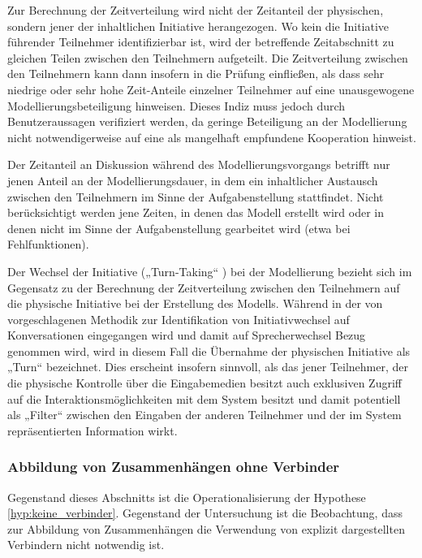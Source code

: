 Zur Berechnung der Zeitverteilung wird nicht der Zeitanteil der physischen, sondern jener der inhaltlichen Initiative herangezogen. Wo kein die Initiative führender Teilnehmer identifizierbar ist, wird der betreffende Zeitabschnitt zu gleichen Teilen zwischen den Teilnehmern aufgeteilt. Die Zeitverteilung zwischen den Teilnehmern kann dann insofern in die Prüfung einfließen, als dass sehr niedrige oder sehr hohe Zeit-Anteile einzelner Teilnehmer auf eine unausgewogene Modellierungsbeteiligung hinweisen. Dieses Indiz muss jedoch durch Benutzeraussagen verifiziert werden, da geringe Beteiligung an der Modellierung nicht notwendigerweise auf eine als mangelhaft empfundene Kooperation hinweist.

Der Zeitanteil an Diskussion während des Modellierungsvorgangs betrifft nur jenen Anteil an der Modellierungsdauer, in dem ein inhaltlicher Austausch zwischen den Teilnehmern im Sinne der Aufgabenstellung stattfindet. Nicht berücksichtigt werden jene Zeiten, in denen das Modell erstellt wird oder in denen nicht im Sinne der Aufgabenstellung gearbeitet wird (etwa bei Fehlfunktionen).

Der Wechsel der Initiative („Turn-Taking“ \citep{Sacks74}) bei der Modellierung bezieht sich im Gegensatz zu der Berechnung der Zeitverteilung zwischen den Teilnehmern auf die physische Initiative bei der Erstellung des Modells. Während in der von \citet{Sacks74} vorgeschlagenen Methodik zur Identifikation von Initiativwechsel auf Konversationen eingegangen wird und damit auf Sprecherwechsel Bezug genommen wird, wird in diesem Fall die Übernahme der physischen Initiative als „Turn“ bezeichnet. Dies erscheint insofern sinnvoll, als das jener Teilnehmer, der die physische Kontrolle über die Eingabemedien besitzt auch exklusiven Zugriff auf die Interaktionsmöglichkeiten mit dem System besitzt und damit potentiell als „Filter“ zwischen den Eingaben der anderen Teilnehmer und der im System repräsentierten Information wirkt.


\subsubsection{Abbildung von Zusammenhängen ohne Verbinder} %
\label{ssub:abbildung_von_zusammenhängen_ohne_verbinder}

Gegenstand dieses Abschnitts ist die Operationalisierung der Hypothese \ref{hyp:keine_verbinder}. Gegenstand der Untersuchung ist die Beobachtung, dass zur Abbildung von Zusammenhängen die Verwendung von explizit dargestellten Verbindern nicht notwendig ist.

